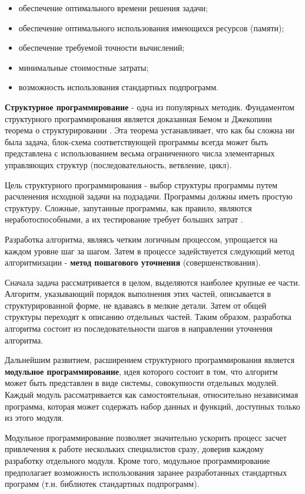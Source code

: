 \begin{itemize}
    \item обеспечение оптимального времени решения задачи;
    \item обеспечение оптимального использования имеющихся ресурсов (памяти);
    \item обеспечение требуемой точности вычислений;
    \item минимальные стоимостные затраты;
    \item возможность использования стандартных подпрограмм.
\end{itemize}

\textbf{Структурное программирование} - одна из популярных методик. Фундаментом структурного программирования является доказанная Бемом и Джекопини теорема о структурировании \cite{algorithm_theory}. Эта теорема устанавливает, что как бы сложна ни была задача, блок-схема соответствующей программы всегда может быть представлена с использованием весьма ограниченного числа элементарных управляющих структур (последовательность, ветвление, цикл).

Цель структурного программирования - выбор структуры программы путем расчленения исходной задачи на подзадачи. Программы должны иметь простую структуру. Сложные, запутанные программы, как правило, являются неработоспособными, а их тестирование требует больших затрат \cite{comp:algoritm}.

Разработка алгоритма, являясь четким логичным процессом, упрощается на каждом уровне шаг за шагом. Затем в процессе задействуется следующий метод алгоритмизации - \textbf{метод пошагового уточнения} (совершенствования).

Сначала задача рассматривается в целом, выделяются наиболее крупные ее части. Алгоритм, указывающий порядок выполнения этих частей, описывается в структурированной форме, не вдаваясь в мелкие детали. Затем от общей структуры переходят к описанию отдельных частей. Таким образом, разработка алгоритма состоит из последовательности шагов в направлении уточнения алгоритма.

Дальнейшим развитием, расширением структурного программирования является \textbf{модульное программирование}, идея которого состоит в том, что алгоритм может быть представлен в виде системы, совокупности отдельных модулей. Каждый модуль рассматривается как самостоятельная, относительно независимая программа, которая может содержать набор данных и функций, доступных только из этого модуля.

Модульное программирование позволяет значительно ускорить процесс засчет привлечения к работе нескольких специалистов сразу, доверив каждому разработку отдельного модуля. Кроме того, модульное программирование предполагает возможность использования заранее разработанных стандартных программ (т.н. библиотек стандартных подпрограмм).

